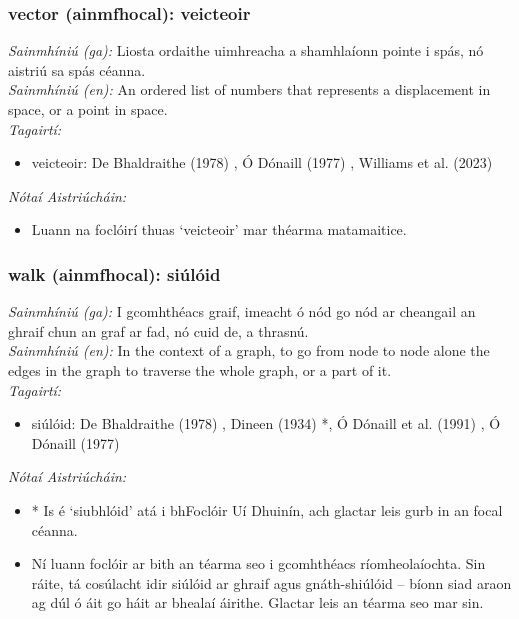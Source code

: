 \subsubsection*{vector (ainmfhocal): veicteoir}
 \noindent \textit{Sainmhíniú (ga):} Liosta ordaithe uimhreacha a shamhlaíonn pointe i spás, nó aistriú sa spás céanna.
\\
 \noindent \textit{Sainmhíniú (en):} An ordered list of numbers that represents a displacement in space, or a point in space.
\\
 \noindent \textit{Tagairtí:}
\begin{itemize}
	\item veicteoir: De Bhaldraithe (1978) \cite{de-bhaldraithe}, Ó Dónaill (1977) \cite{odonaill}, Williams et al. (2023) \cite{storchiste}
\end{itemize}

 \noindent \textit{Nótaí Aistriúcháin:}
\begin{itemize}
	\item Luann na foclóirí thuas `veicteoir' mar théarma matamaitice.
\end{itemize}


\subsubsection*{walk (ainmfhocal): siúlóid}
 \noindent \textit{Sainmhíniú (ga):} I gcomhthéacs graif, imeacht ó nód go nód ar cheangail an ghraif chun an graf ar fad, nó cuid de, a thrasnú.
\\
 \noindent \textit{Sainmhíniú (en):} In the context of a graph, to go from node to node alone the edges in the graph to traverse the whole graph, or a part of it.
\\
 \noindent \textit{Tagairtí:}
\begin{itemize}
	\item siúlóid: De Bhaldraithe (1978) \cite{de-bhaldraithe}, Dineen (1934) \cite{dineen}*, Ó Dónaill et al. (1991) \cite{focloir-beag}, Ó Dónaill (1977) \cite{odonaill}
\end{itemize}

 \noindent \textit{Nótaí Aistriúcháin:}
\begin{itemize}
	\item * Is é `siubhlóid' atá i bhFoclóir Uí Dhuinín, ach glactar leis gurb in an focal céanna.
	\item Ní luann foclóir ar bith an téarma seo i gcomhthéacs ríomheolaíochta. Sin ráite, tá cosúlacht idir siúlóid ar ghraif agus gnáth-shiúlóid -- bíonn siad araon ag dúl ó áit go háit ar bhealaí áirithe. Glactar leis an téarma seo mar sin.
\end{itemize}


